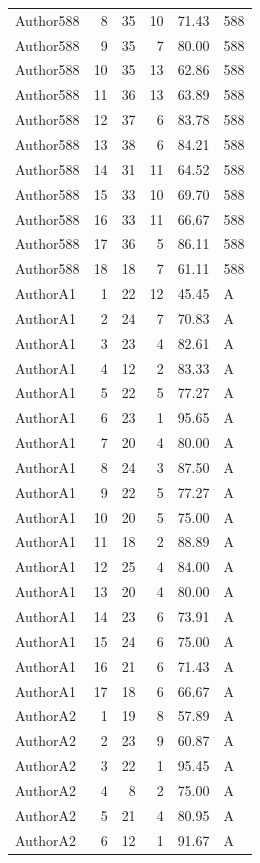 \begin{longtable}{lrrrrl}
Author588 & 8 & 35 & 10 & 71.43 & 588\\
Author588 & 9 & 35 & 7 & 80.00 & 588\\
Author588 & 10 & 35 & 13 & 62.86 & 588\\
Author588 & 11 & 36 & 13 & 63.89 & 588\\
Author588 & 12 & 37 & 6 & 83.78 & 588\\
Author588 & 13 & 38 & 6 & 84.21 & 588\\
Author588 & 14 & 31 & 11 & 64.52 & 588\\
Author588 & 15 & 33 & 10 & 69.70 & 588\\
Author588 & 16 & 33 & 11 & 66.67 & 588\\
Author588 & 17 & 36 & 5 & 86.11 & 588\\
Author588 & 18 & 18 & 7 & 61.11 & 588\\
AuthorA1 & 1 & 22 & 12 & 45.45 & A\\
AuthorA1 & 2 & 24 & 7 & 70.83 & A\\
AuthorA1 & 3 & 23 & 4 & 82.61 & A\\
AuthorA1 & 4 & 12 & 2 & 83.33 & A\\
AuthorA1 & 5 & 22 & 5 & 77.27 & A\\
AuthorA1 & 6 & 23 & 1 & 95.65 & A\\
AuthorA1 & 7 & 20 & 4 & 80.00 & A\\
AuthorA1 & 8 & 24 & 3 & 87.50 & A\\
AuthorA1 & 9 & 22 & 5 & 77.27 & A\\
AuthorA1 & 10 & 20 & 5 & 75.00 & A\\
AuthorA1 & 11 & 18 & 2 & 88.89 & A\\
AuthorA1 & 12 & 25 & 4 & 84.00 & A\\
AuthorA1 & 13 & 20 & 4 & 80.00 & A\\
AuthorA1 & 14 & 23 & 6 & 73.91 & A\\
AuthorA1 & 15 & 24 & 6 & 75.00 & A\\
AuthorA1 & 16 & 21 & 6 & 71.43 & A\\
AuthorA1 & 17 & 18 & 6 & 66.67 & A\\
AuthorA2 & 1 & 19 & 8 & 57.89 & A\\
AuthorA2 & 2 & 23 & 9 & 60.87 & A\\
AuthorA2 & 3 & 22 & 1 & 95.45 & A\\
AuthorA2 & 4 & 8 & 2 & 75.00 & A\\
AuthorA2 & 5 & 21 & 4 & 80.95 & A\\
AuthorA2 & 6 & 12 & 1 & 91.67 & A\\

\end{longtable}
